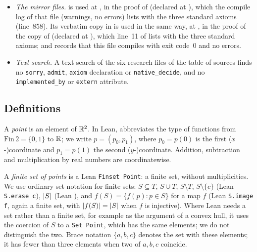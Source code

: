 {\begin{itemize}
  only definitions.
\item \emph{The mirror files.}  is used at
  , in the proof of 
  (declared at ), which the compile log
   of that file (warnings, no errors) lists with the three standard
  axioms (line~858). Its verbatim copy in  is used in the
  same way, at , in the proof of the copy of
   (declared at ),
  which line~11 of  lists with the three standard axioms; and
   records that this file compiles with exit code~0 and no errors.
\item \emph{Text search.} A text search of the six research files of the table of sources finds no
  \texttt{sorry}, \texttt{admit}, \texttt{axiom} declaration or \texttt{native\_decide}, and no
  \texttt{implemented\_by} or \texttt{extern} attribute.
\end{itemize}
\par}

\subsection{Definitions}\label{fd:sec-defs}

\begin{definition}\label{fd:def:point}\sloppy
A \emph{point} is an element of $\mathbb R^2$. In Lean,  abbreviates the type of functions from
$\mathrm{Fin}\,2=\{0,1\}$ to $\mathbb R$; we write $p=(p_0,p_1)$, where $p_0=p(0)$ is the first
($x$-)coordinate and $p_1=p(1)$ the second ($y$-)coordinate. Addition, subtraction and multiplication by
real numbers are coordinatewise.

A \emph{finite set of points} is a Lean \texttt{Finset Point}: a finite set, without multiplicities. We use
ordinary set notation for finite sets: $S\subseteq T$, $S\cup T$, $S\setminus T$, $S\setminus\{c\}$
(Lean \texttt{S.erase c}), $\lvert S\rvert$ (Lean ), and $f(S)=\{f(p):p\in S\}$ for a map $f$ (Lean
\texttt{S.image f}, again a finite set, with $\lvert f(S)\rvert=\lvert S\rvert$ when $f$ is injective). Where Lean needs
a set rather than a finite set, for example as the argument of a convex hull, it uses the coercion of $S$
to a \texttt{Set Point}, which has the same elements; we do not distinguish the two. Brace notation
$\{a,b,c\}$ denotes the set with these elements; it has fewer than three elements when two of $a,b,c$
coincide.
\end{definition}

